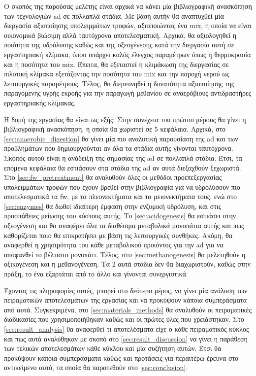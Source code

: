 \documentclass[11pt]{report}
\begin{document}
Ο σκοπός της παρούσας μελέτης είναι αρχικά να κάνει μία βιβλιογραφική ανασκόπηση των τεχνολογιών \acrshort{ad} σε πολλαπλά στάδια. Με βάση αυτήν θα αναπτυχθεί μία διεργασία αξιοποίησης υπολειμμάτων τροφών, αξιοποιώντας ένα \acrfull{mix}, η οποία να είναι οικονομικά βιώσιμη αλλά ταυτόχρονα αποτελεσματική. Αρχικά, θα αξιολογηθεί η ποιότητα της υδρόλυσης καθώς και της οξεογένεσης κατά την διεργασία αυτή σε εργαστηριακή κλίμακα, όπου υπάρχει καλός έλεγχος παραμέτρων όπως η θερμοκρασία και η ποσότητα του \acrshort{mix}. Έπειτα, θα εξεταστεί η κλιμάκωση της διεργασίας σε πιλοτική κλίμακα εξετάζοντας την ποσότητα του \acrshort{mix} και την παροχή νερού ως λειτουργικές παραμέτρους. Τέλος, θα διερευνηθεί η δυνατότητα αξιοποίησης της παραγόμενης υγρής εκροής για την παραγωγή μεθανίου σε αναερόβιους αντιδραστήρες εργαστηριακής κλίμακας.

Η δομή της εργασίας θα είναι ως εξής: Στην συνέχεια του πρώτου μέρους θα γίνει η βιβλιογραφική ανασκόπηση, η οποία θα χωριστεί σε 5 κεφάλαια. Αρχικά, στο \autoref{sec:anaerobic_digestion} θα γίνει μία πιο αναλυτική παρουσίαση της \acrshort{ad} και των προβλημάτων που δημιουργούνται αν όλα τα στάδια αυτής γίνονται ταυτόχρονα. Σκοπός αυτού είναι η ανάδειξη της σημασίας της \acrshort{ad} σε πολλαπλά στάδια. Έτσι, τα επόμενα κεφάλαια θα εστιάσουν στα στάδια της \acrshort{ad} αν αυτά διεξαχθούν ξεχωριστά. Στο \autoref{sec:fw_pretreatment} θα αναλυθούν όλες οι μεθόδοι προεπεξεργασίας υπολειμμάτων τροφών που έχουν βρεθεί στην βιβλιογραφία για να υδρολύσουν πιο αποτελεσματικά τα \acrshort{fw}, με τα πλεονεκτήματα και τα μειονεκτήματα τους, ενώ στο \autoref{sec:enzymes} θα δωθεί ιδιαίτερη έμφαση στην ενζυμική υδρόλυση, και στις προσπάθειες μείωσης του κόστους αυτής. Το \autoref{sec:acidogenesis} θα εστιάσει στην οξεογένεση και θα αναφέρει όλα τα διαθέσιμα μεταβολικά μονοπάτια αυτής και πως καθορίζεται ποιο θα επικρατήσει με βάση τις λειτουργικές συνθήκες. Ακόμη, θα αναφερθεί η χρησιμότητα του κάθε μεταβολικού προιόντος για την \acrshort{ad} για να αποφανθεί το βέλτιστο μονοπάτι. Τέλος, στο \autoref{sec:methanogenesis} θα μελετηθούν η οξικογένεση και η μεθανογένεση. Τα 2 αυτά στάδια δεν θα διαχωριστούν, καθώς στην πράξη, το ένα εξαρτάται από το άλλο και γίνονται συνεργιστικά.

Έχοντας τις πληροφορίες αυτές, μπορεί στο δεύτερο μέρος, να γίνει μία ανάλυση των πειραματικών αποτελεσμάτων της εργασίας και να προκύψουν κάποια συμπεράσματα από αυτά. Συγκεκριμένα, στο \autoref{sec:materials_methods} θα αναλυθούν οι πειραματικές διαδικασίες που χρησιμοποιήθηκαν καθώς και οι πρώτες ύλες που χρειάστηκαν. Στο \autoref{sec:result_analysis} θα αναφερθεί τι αποτελέσματα είχε ο κάθε πειραματικός κύκλος και πως αυτά αναλύθηκαν με σκοπό στο \autoref{sec:result_discussion} να γίνει η παράθεση των τελικών αποτελεσμάτων κάθε κύκλου και μία συζήτηση αυτών. Έτσι θα προκύψουν κάποια συμπεράσματα καθώς και προτάσεις για περαιτέρω έρευνα στο αντικείμενο αυτό, τα οποία θα παρατεθούν στο \autoref{sec:conclusion}.
\end{document}
